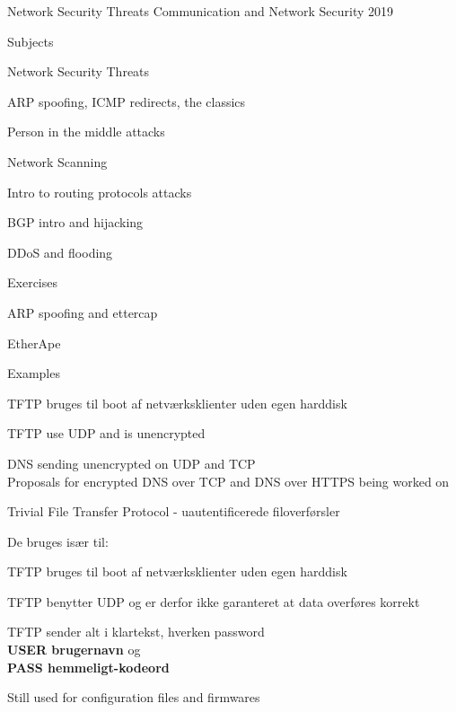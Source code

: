 \documentclass[Screen16to9,17pt]{foils}
\begin{document}
\mytitlepage
{Network Security Threats}
{Communication and Network Security 2019}


\begin{list1}
\item Subjects
\begin{list2}
\item Network Security Threats
\item ARP spoofing, ICMP redirects, the classics
\item Person in the middle attacks
\item Network Scanning
\item Intro to routing protocols attacks
\item BGP intro and hijacking
\item DDoS and flooding
\end{list2}
\item Exercises
\begin{list2}
\item ARP spoofing and ettercap
\item EtherApe
\end{list2}
\end{list1}


Examples
\begin{list2}
\item TFTP bruges til boot af netværksklienter uden egen harddisk
\item TFTP use UDP and is unencrypted
\item DNS sending unencrypted on UDP and TCP\\
Proposals for encrypted DNS over TCP and DNS over HTTPS being worked on
\end{list2}



\begin{list1}
\item Trivial File Transfer Protocol - uautentificerede filoverførsler
\item De bruges især til:
  \begin{list2}
\item TFTP bruges til boot af netværksklienter uden egen harddisk
\item TFTP benytter UDP og er derfor ikke garanteret at data overføres korrekt
  \end{list2}
\item TFTP sender alt i klartekst, hverken password \\
{\bfseries USER brugernavn} og \\
{\bfseries PASS hemmeligt-kodeord}
\end{list1}
Still used for configuration files and firmwares
\end{document}
